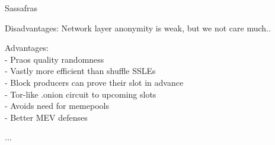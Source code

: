 \documentclass{beamer}
\begin{document}
\begin{frame}{Sassafras}

Disadvantages: Network layer anonymity is weak, but we not care much..

\bigskip\bigskip

Advantages: \\ \smallskip
- Praos quality randomness \\ \smallskip
- Vastly more efficient than shuffle SSLEs \\ \smallskip
- Block producers can prove their slot in advance \\ \smallskip
- Tor-like {.onion} circuit to upcoming slots \\ \smallskip
- Avoids need for memepools \\ \smallskip
- Better MEV defenses \\ \smallskip

\end{frame}



\begin{frame}
	
...	
	
\end{frame}
\end{document}
